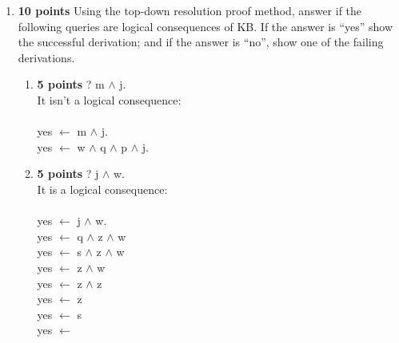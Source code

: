 \documentclass{article}
\def\ans#1{{\color{ans}#1}}
\begin{document}
\begin{enumerate}[label=(\alph*)]
\begin{enumerate}[label=\roman*.]
{            %
        }
    \end{enumerate}
    \item \textbf{10 points} Using the top-down resolution proof method, answer if the following queries are logical consequences of KB. If the answer is “yes” show the successful derivation; and if the answer is “no”, show one of the failing derivations.\\
    \begin{enumerate}[label=\roman*.]
        \item \textbf{5 points} ? m $\wedge$ j.\\
        \ans{
          It isn't a logical consequence: \\ \\
          yes $\leftarrow$ m $\wedge$ j. \\
          yes $\leftarrow$ w $\wedge$ q $\wedge$ p $\wedge$ j. \\
          \fbox{yes $\leftarrow$ u $\wedge$ x $\wedge$ q $\wedge$ p  $\wedge$ j.}
      } 
        \item \textbf{5 points} ? j $\wedge$ w.\\
        \ans{
          It is a logical consequence: \\ \\
          yes $\leftarrow$ j $\wedge$ w. \\
          yes $\leftarrow$ q $\wedge$ z $\wedge$ w\\
          yes $\leftarrow$ s $\wedge$ z $\wedge$ w\\
          yes $\leftarrow$ z $\wedge$ w\\
          yes $\leftarrow$ z $\wedge$ z\\
          yes $\leftarrow$ z \\
          yes $\leftarrow$ s \\
          yes $\leftarrow$ 
      }
    \end{enumerate}
\end{enumerate}

\clearpage
\end{document}
